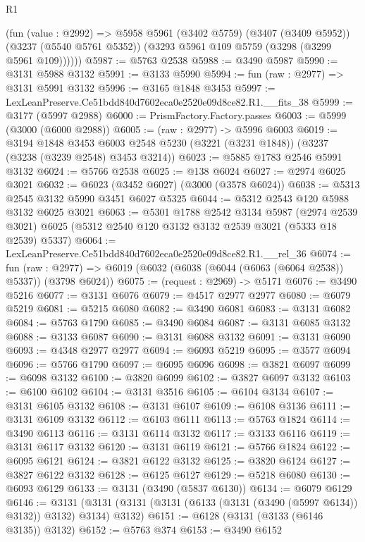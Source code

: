 \begin{lexlean}{R1}
\begin{coremodule}
        (fun (value : @2992) =>
        @5958
          @5961
          (@3402 @5759)
          (@3407 (@3409 @5952))
          (@3237 (@5540 @5761 @5352))
          (@3293 @5961 @109 @5759 (@3298 (@3299 @5961 @109))))))
@5987 := @5763 @2538
@5988 := @3490 @5987
@5990 := @3131 @5988 @3132
@5991 := @3133 @5990
@5994 := fun (raw : @2977) => @3131 @5991 @3132
@5996 := @3165 @1848 @3453
@5997 := LexLeanPreserve.Ce51bdd840d7602eca0e2520e09d8ce82.R1.__fits_38
@5999 := @3177 (@5997 @2988)
@6000 := PrismFactory.Factory.passes
@6003 := @5999 (@3000 (@6000 @2988))
@6005 := (raw : @2977) -> @5996 @6003
@6019 := @3194
    @1848
    @3453
    @6003
    @2548
    @5230
    (@3221 (@3231 @1848))
    (@3237 (@3238 (@3239 @2548) @3453 @3214))
@6023 := @5885 @1783 @2546 @5991 @3132
@6024 := @5766 @2538
@6025 := @138 @6024
@6027 := @2974 @6025 @3021
@6032 := @6023 (@3452 @6027) (@3000 (@3578 @6024))
@6038 := @5313 @2545 @3132 @5990 @3451 @6027 @5325
@6044 := @5312 @2543 @120 @5988 @3132 @6025 @3021
@6063 := @5301
    @1788
    @2542
    @3134
    @5987
    (@2974 @2539 @3021)
    @6025
    (@5312 @2540 @120 @3132 @3132 @2539 @3021 (@5333 @18 @2539) @5337)
@6064 := LexLeanPreserve.Ce51bdd840d7602eca0e2520e09d8ce82.R1.__rel_36
@6074 := fun (raw : @2977) =>
  @6019 (@6032 (@6038 (@6044 (@6063 (@6064 @2538)) @5337)) (@3798 @6024))
@6075 := (request : @2969) -> @5171
@6076 := @3490 @5216
@6077 := @3131 @6076
@6079 := @4517 @2977 @2977
@6080 := @6079 @5219
@6081 := @5215 @6080
@6082 := @3490 @6081
@6083 := @3131 @6082
@6084 := @5763 @1790
@6085 := @3490 @6084
@6087 := @3131 @6085 @3132
@6088 := @3133 @6087
@6090 := @3131 @6088 @3132
@6091 := @3131 @6090
@6093 := @4348 @2977 @2977
@6094 := @6093 @5219
@6095 := @3577 @6094
@6096 := @5766 @1790
@6097 := @6095 @6096
@6098 := @3821 @6097
@6099 := @6098 @3132
@6100 := @3820 @6099
@6102 := @3827 @6097 @3132
@6103 := @6100 @6102
@6104 := @3131 @3516
@6105 := @6104 @3134
@6107 := @3131 @6105 @3132
@6108 := @3131 @6107
@6109 := @6108 @3136
@6111 := @3131 @6109 @3132
@6112 := @6103 @6111
@6113 := @5763 @1824
@6114 := @3490 @6113
@6116 := @3131 @6114 @3132
@6117 := @3133 @6116
@6119 := @3131 @6117 @3132
@6120 := @3131 @6119
@6121 := @5766 @1824
@6122 := @6095 @6121
@6124 := @3821 @6122 @3132
@6125 := @3820 @6124
@6127 := @3827 @6122 @3132
@6128 := @6125 @6127
@6129 := @5218 @6080
@6130 := @6093 @6129
@6133 := @3131 (@3490 (@5837 @6130))
@6134 := @6079 @6129
@6146 := @3131 (@3131 (@3131 (@3131 (@6133 (@3131 (@3490 (@5997 @6134)) @3132)) @3132) @3134) @3132)
@6151 := @6128 (@3131 (@3133 (@6146 @3135)) @3132)
@6152 := @5763 @374
@6153 := @3490 @6152

\end{coremodule}
\end{lexlean}
